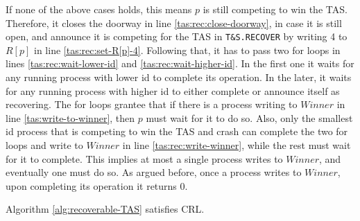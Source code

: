 If none of the above cases holds, this means $p$ is still competing to win the TAS. Therefore, it closes the doorway in line \ref{tas:rec:close-doorway}, in case it is still open, and announce it is competing for the TAS in \texttt{T\&S.RECOVER} by writing 4 to $R[p]$ in line \ref{tas:rec:set-R[p]-4}. Following that, it has to pass two for loops in lines \ref{tas:rec:wait-lower-id} and \ref{tas:rec:wait-higher-id}. In the first one it waits for any running process with lower id to complete its operation. In the later, it waits for any running process with higher id to either complete or announce itself as recovering.
The for loops grantee that if there is a process writing to $Winner$ in line \ref{tas:write-to-winner}, then $p$ must wait for it to do so. Also, only the smallest id process that is competing to win the TAS and crash can complete the two for loops and write to $Winner$ in line \ref{tas:rec:write-winner}, while the rest must wait for it to complete. This implies at most a single process writes to $Winner$, and eventually one must do so. As argued before, once a process writes to $Winner$, upon completing its operation it returns 0.



\begin{claim}
	Algorithm \ref{alg:recoverable-TAS} satisfies CRL.
\end{claim}

